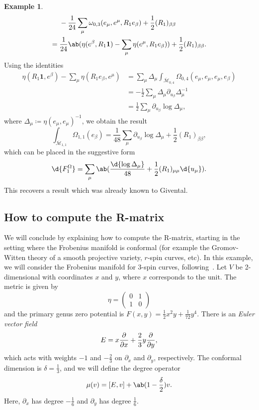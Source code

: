 \documentclass{amsart}
\theoremstyle{definition}
\newtheorem{exm}[thm]{Example}
\theoremstyle{remark}
\theoremstyle{plain}
\theoremstyle{definition}
\theoremstyle{remark}
\newcommand{\Mbar}{\overline{\mathcal{M}}}
\newcommand{\1}{\mathbf{1}}
\newcommand{\2}{\mathbf{2}}
\newcommand{\3}{\mathbf{3}}
\begin{document}
\begin{exm}
\begin{align*}
        &-\frac{1}{24} \sum_{\mu} \omega_{0,3}(e_{\mu}, e^{\mu}, R_1 e_{\beta}) + \frac{1}{2} (R_1)_{\beta\beta} \\
        ={}& \frac{1}{24} \ab(\eta(e^{\beta}, R_1 \1) - \sum_{\mu} \eta(e^{\mu}, R_1 e_{\beta})) + \frac{1}{2} (R_1)_{\beta\beta}.
    \end{align*}
    Using the identities
    \begin{align*}
        \eta(R_1 \1, e^{\beta}) - \sum_{\mu} \eta(R_1 e_{\beta}, e^{\mu}) &= \sum_{\mu} \Delta_{\mu} \int_{\Mbar_{0,4}} \Omega_{0,4}(e_{\mu}, e_{\mu}, e_{\mu}, e_{\beta}) \\
        &= -\frac{1}{2}\sum_{\mu} \Delta_{\mu} \partial_{u_{\beta}} \Delta_{\mu}^{-1} \\
        &= \frac{1}{2} \sum_{\mu} \partial_{u_{\beta}} \log \Delta_{\mu},
    \end{align*}
    where $\Delta_{\mu} \coloneqq \eta(e_{\mu}, e_{\mu})^{-1}$, we obtain the result
    \[ \int_{\Mbar_{1,1}} \Omega_{1,1}(e_{\beta}) = \frac{1}{48} \sum_{\mu} \partial_{u_{\beta}} \log \Delta_{\mu} + \frac{1}{2} (R_1)_{\beta\beta}, \]
    which can be placed in the suggestive form
    \[ \d{F_1^{\Omega}} = \sum_{\mu} \ab( \frac{\d{\log \Delta_{\mu}}}{48} + \frac{1}{2} (R_1)_{\mu\mu} \d{u_{\mu}} ). \]
    This recovers a result which was already known to Givental.
\end{exm}

\subsection{How to compute the R-matrix}%
\label{sub:How to compute the R-matrix}

We will conclude by explaining how to compute the R-matrix, starting in the setting where the Frobenius manifold is conformal (for example the Gromov-Witten theory of a smooth projective variety, \(r\)-spin curves, etc). In this example, we will consider the Frobenius manifold for 3-spin curves, following~\cite{PPZ2015}. Let \(V\) be 2-dimensional with coordinates \(x\) and \(y\), where \(x\) corresponds to the unit. The metric is given by
\[ \eta = \begin{pmatrix}
    0 & 1 \\
    1 & 0
\end{pmatrix} \]
and the primary genus zero potential is \(F(x,y) = \frac{1}{2} x^2 y + \frac{1}{72} y^4\). There is an \textit{Euler vector field}
\[ E = x \pdv{}{x} + \frac{2}{3} y \pdv{}{y}, \]
which acts with weights \(-1\) and \(-\frac{2}{3}\) on \(\partial_x\) and \(\partial_y\), respectively. The conformal dimension is \(\delta = \frac{1}{3}\), and we will define the degree operator
\[ \mu(v) = [E,v] + \ab(1 - \frac{\delta}{2})v. \]
Here, \(\partial_x\) has degree \(-\frac{1}{6}\) and \(\partial_y\) has degree \(\frac{1}{6}\).
\end{document}
